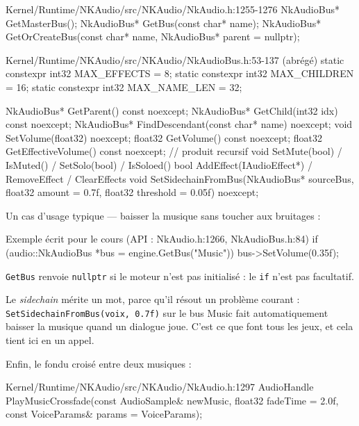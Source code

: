\begin{nkcode}{Kernel/Runtime/NKAudio/src/NKAudio/NkAudio.h:1255-1276}
NkAudioBus* GetMasterBus();
NkAudioBus* GetBus(const char* name);
NkAudioBus* GetOrCreateBus(const char* name, NkAudioBus* parent = nullptr);
\end{nkcode}

\begin{nkcode}{Kernel/Runtime/NKAudio/src/NKAudio/NkAudioBus.h:53-137 (abrégé)}
static constexpr int32 MAX_EFFECTS = 8;
static constexpr int32 MAX_CHILDREN = 16;
static constexpr int32 MAX_NAME_LEN = 32;

NkAudioBus* GetParent() const noexcept;
NkAudioBus* GetChild(int32 idx) const noexcept;
NkAudioBus* FindDescendant(const char* name) noexcept;
void SetVolume(float32) noexcept;  float32 GetVolume() const noexcept;
float32 GetEffectiveVolume() const noexcept;              // produit recursif
void SetMute(bool) / IsMuted() / SetSolo(bool) / IsSoloed()
bool AddEffect(IAudioEffect*) / RemoveEffect / ClearEffects
void SetSidechainFromBus(NkAudioBus* sourceBus, float32 amount = 0.7f,
                         float32 threshold = 0.05f) noexcept;
\end{nkcode}

Un cas d'usage typique — baisser la musique sans toucher aux bruitages :

\begin{nkcode}{Exemple écrit pour le cours (API : NkAudio.h:1266, NkAudioBus.h:84)}
if (audio::NkAudioBus *bus = engine.GetBus("Music"))
    bus->SetVolume(0.35f);
\end{nkcode}

\texttt{GetBus} renvoie \texttt{nullptr} si le moteur n'est pas initialisé : le
\texttt{if} n'est pas facultatif.

Le \emph{sidechain} mérite un mot, parce qu'il résout un problème courant :
\texttt{SetSidechainFromBus(voix, 0.7f)} sur le bus Music fait automatiquement
baisser la musique quand un dialogue joue. C'est ce que font tous les jeux, et
cela tient ici en un appel.

Enfin, le fondu croisé entre deux musiques :

\begin{nkcode}{Kernel/Runtime/NKAudio/src/NKAudio/NkAudio.h:1297}
AudioHandle PlayMusicCrossfade(const AudioSample& newMusic, float32 fadeTime = 2.0f,
                               const VoiceParams& params = VoiceParams{});
\end{nkcode}

